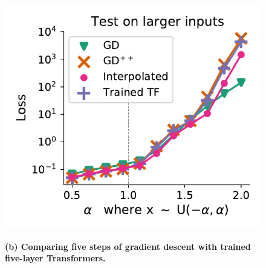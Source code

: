 \documentclass{article}
\theoremstyle{plain}
\theoremstyle{definition}
\theoremstyle{remark}
\begin{document}
\begin{figure}
\begin{center}
\begin{minipage}{.24\textwidth}
\begin{center}
  \end{center}
  \vspace{-10pt}
\end{minipage}
\begin{minipage}{.24\textwidth}
  \centering
  \begin{center}
    \includegraphics[width=1.\textwidth]{Final_figures/linear/two_layers_rec/normal.pdf}
  \end{center}
  \vspace{-10pt}
\end{minipage}

\end{center}
\textbf{(b) Comparing five steps of gradient descent with trained five-layer Transformers.}


\end{figure}
\end{document}
